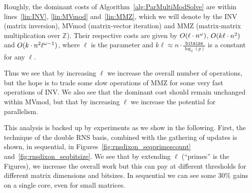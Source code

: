 Roughly, the dominant costs of Algorithm~\ref{alg:ParMultiModSolve}
are within lines~\ref{lin:INV}, \ref{lin:MVmod} and~\ref{lin:MMZ},
which we will denote by the INV (matrix inversion), MVmod
(matrix-vector iteration) and MMZ (matrix-matrix multiplication over
$\mathbb{Z}$).
Their respective costs are given by $\GO{\ell\cdot{}n^\omega}$,
$\GO{k\ell\cdot{}n^2}$ and $\GO{k\cdot{}n^2\ell^{\omega-1}}$,
where $\ell$ is the parameter and $k\ell\approx n \cdot
\frac{\texttt{bitsize}}{\log_2(p)}$ is a constant for any $\ell$.

Thus we see that by increasing $\ell$ we increase the overall number
of operations, but the hope is to trade some slow operations of MMZ
for some very fast operations of INV.
We also see that the dominant cost should remain unchanged within MVmod, but
that by increasing $\ell$ we increase the potential for
parallelism.

This analysis is backed up by experiments as we show in the following.
%
First, the technique of the double RNS basis, combined with the
gathering of updates is shown, in sequential, in
Figures~\ref{fig:rnsdixon_seqprimescount}
and~\ref{fig:rnsdixon_seqbitsize}. We see that by extending $\ell$
(``primes'' is the Figures), we increase the overall work but this
can pay at different thresholds for different matrix dimensions and
bitsizes. In sequential we can see some $30\%$ gains on a single core,
even for small matrices.


